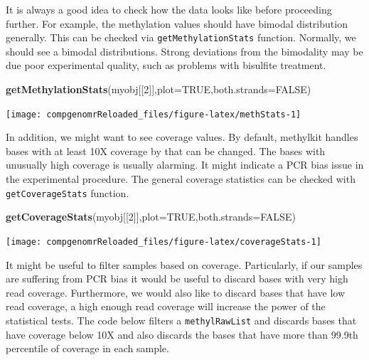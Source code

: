 \documentclass[12pt,]{krantz}
\newenvironment{Shaded}{\begin{snugshade}}{\end{snugshade}}
\newcommand{\DataTypeTok}[1]{\textcolor[rgb]{0.13,0.29,0.53}{#1}}
\newcommand{\DecValTok}[1]{\textcolor[rgb]{0.00,0.00,0.81}{#1}}
\newcommand{\KeywordTok}[1]{\textcolor[rgb]{0.13,0.29,0.53}{\textbf{#1}}}
\newcommand{\NormalTok}[1]{#1}
\newcommand{\OtherTok}[1]{\textcolor[rgb]{0.56,0.35,0.01}{#1}}
\begin{document}
It is always a good idea to check how the data looks like before proceeding further. For example, the methylation values should have bimodal distribution generally. This can be checked via
\texttt{getMethylationStats} function. Normally, we should see a bimodal
distributions. Strong deviations from the bimodality may be due poor experimental quality, such as problems with bisulfite treatment.

\begin{Shaded}
\begin{Highlighting}[]
\KeywordTok{getMethylationStats}\NormalTok{(myobj[[}\DecValTok{2}\NormalTok{]],}\DataTypeTok{plot=}\OtherTok{TRUE}\NormalTok{,}\DataTypeTok{both.strands=}\OtherTok{FALSE}\NormalTok{)}
\end{Highlighting}
\end{Shaded}

\begin{center}\texttt{[image: compgenomrReloaded\_files/figure-latex/methStats-1]} \end{center}

In addition, we might want to see coverage values. By default, methylkit handles bases with at least 10X coverage by that can be changed. The bases with unusually high coverage is usually alarming. It might indicate a PCR bias issue in the experimental procedure. The general coverage statistics can be checked with
\texttt{getCoverageStats} function.

\begin{Shaded}
\begin{Highlighting}[]
\KeywordTok{getCoverageStats}\NormalTok{(myobj[[}\DecValTok{2}\NormalTok{]],}\DataTypeTok{plot=}\OtherTok{TRUE}\NormalTok{,}\DataTypeTok{both.strands=}\OtherTok{FALSE}\NormalTok{)}
\end{Highlighting}
\end{Shaded}

\begin{center}\texttt{[image: compgenomrReloaded\_files/figure-latex/coverageStats-1]} \end{center}

It might be useful to filter samples based on coverage. Particularly, if our samples are suffering from PCR bias it would be useful to discard bases with very high read coverage. Furthermore, we would also like to discard bases that have low read coverage, a high enough read coverage will increase the power of the statistical tests. The code below filters a \texttt{methylRawList} and discards bases that have coverage below 10X and also discards the bases that have more than 99.9th percentile of coverage in each sample.
\end{document}
